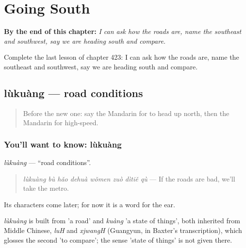 
\chapter{Going South}
\label{ch:zh-going-south}

\begin{chapteropening}
\textbf{By the end of this chapter:} \emph{I can ask how the roads are, name the southeast and southwest, say we are heading south and compare.}

Complete the last lesson of chapter 423: I can ask how the roads are, name the southeast and southwest, say we are heading south and compare.
\end{chapteropening}

\section[lùkuàng]{lùkuàng — road conditions}

\label{lesson:ZH-C423-lukuang}



\begin{quote}
Before the new one: say the Mandarin for to head up north, then the Mandarin for high-speed.
\end{quote}

\subsection*{You'll want to know: lùkuàng}
\emph{lùkuàng} — \textquotedblleft{}road conditions\textquotedblright{}.

\begin{quote}
\emph{lùkuàng bù hǎo dehuà wǒmen zuò dìtiě qù} — If the roads are bad, we'll take the metro.
\end{quote}

Its characters come later; for now it is a word for the ear.

\begin{cousinweb}
\emph{lùkuàng} is built from  'a road' and \emph{kuàng} 'a state of things', both inherited from Middle Chinese, \emph{luH} and \emph{xjwangH} (Guangyun, in Baxter's transcription), which glosses the second 'to compare'; the sense 'state of things' is not given there.
\end{cousinweb}

